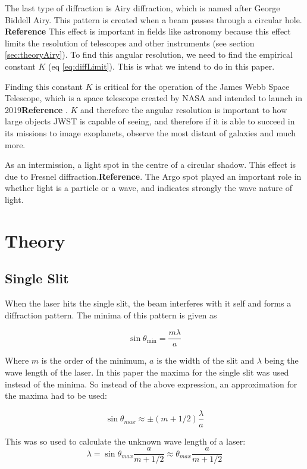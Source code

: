 \documentclass{emulateapj}
\begin{document}
The last type of diffraction is Airy diffraction, which is named after George Biddell Airy. This pattern is created when a beam passes through a circular hole. \textbf{Reference} This effect is important in fields like astronomy because this effect limits the resolution of telescopes and other instruments (see section \ref{sec:theoryAiry}). To find this angular resolution, we need to find the empirical constant $K$ (eq \eqref{eq:diffLimit}). This is what we intend to do in this paper.

Finding this constant $K$ is critical for the operation of the James Webb Space Telescope, which is a space telescope created by NASA and intended to launch in 2019\textbf{Reference} . $K$ and therefore the angular resolution is important to how large objects JWST is capable of seeing, and therefore if it is able to succeed in its missions to image exoplanets, observe the most distant of galaxies and much more.

As an intermission, a light spot in the centre of a circular shadow. This effect is due to Fresnel diffraction.\textbf{Reference}. The Argo spot played an important role in whether light is a particle or a wave, and indicates strongly the wave nature of light.


\section{Theory}
\label{sec:theory}
\subsection{Single Slit}
When the laser hits the single slit, the beam interferes with it self and forms a diffraction pattern. The minima of this pattern is given as 

\begin{equation}
\sin \theta_{\min} = \frac{m\lambda}{a}
\end{equation}

Where $m$ is the order of the minimum, $a$ is the width of the slit and $\lambda$ being the wave length of the laser. In this paper the maxima for the single slit was used instead of the minima. So instead of the above expression, an approximation for the maxima had to be used:

\begin{equation}
\sin \theta_{max} \approx \pm (m+1/2)\frac{\lambda}{a}
\end{equation}\label{eq:slitMax}

This was so used to calculate the unknown wave length of a laser:
\begin{equation}
\lambda = \sin \theta_{max}\frac{a}{m+1/2} \approx \theta_{max}\frac{a}{m+1/2}
\end{equation}
\end{document}
